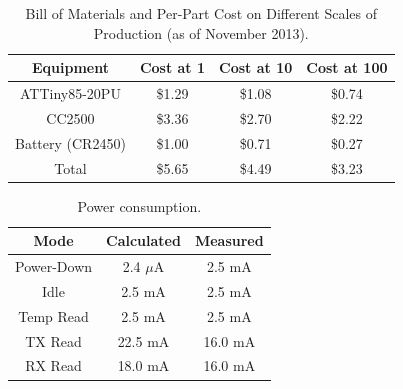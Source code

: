 %
%
\begin{table}%
  \begin{center}

  \caption{Bill of Materials and Per-Part Cost on Different Scales of Production (as of November 2013).
  \label{table:bill}
  }
  
  \begin{tabular}{| c | c | c | c |}

  \hline
  \textbf{Equipment} & \textbf{Cost at 1} & \textbf{Cost at 10} & \textbf{Cost at 100} \\
  \hline
  ATTiny85-20PU     & \$1.29 & \$1.08 & \$0.74 \\
  CC2500            & \$3.36 & \$2.70 & \$2.22 \\
  Battery (CR2450)  & \$1.00 & \$0.71 & \$0.27 \\
  Total             & \$5.65 & \$4.49 & \$3.23 \\
  \hline
  
  \end{tabular}  
  \end{center}

\end{table}

%
%
\begin{table}
  \begin{center}

  \caption{Power consumption.
  \label{table:power_consumption}
  }
  
  \begin{tabular}{| c | c | c |}

  \hline
  \textbf{Mode} & \textbf{Calculated} & \textbf{Measured} \\
  \hline
  Power-Down        & 2.4 $\mu$A & 2.5 mA\\
  Idle              & 2.5 mA & 2.5 mA\\
  Temp Read         & 2.5 mA & 2.5 mA \\
  TX Read           & 22.5 mA & 16.0 mA\\
  RX Read           & 18.0 mA &  16.0 mA\\
  \hline
  
  \end{tabular}  
  \end{center}

\end{table}

